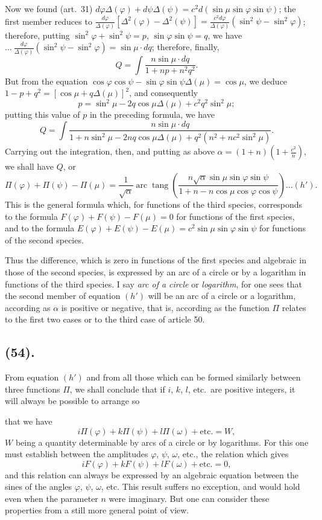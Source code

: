 \documentclass{article}
\begin{document}
Now we found (art.\ 31) $d\varphi\Delta(\varphi)+d\psi\Delta(\psi)=c^{2}d(\sin\mu\sin\varphi\sin\psi)$; the first member reduces to $\frac{d\varphi}{\Delta(\varphi)}[\Delta^{2}(\varphi)-\Delta^{2}(\psi)]=\frac{c^{2}d\varphi}{\Delta(\varphi)}(\sin^{2}\psi-\sin^{2}\varphi)$; therefore, putting $\sin^{2}\varphi+\sin^{2}\psi=p$, $\sin\varphi\sin\psi=q$, we have~$\ldots\ \frac{d\varphi}{\Delta(\varphi)}(\sin^{2}\psi-\sin^{2}\varphi)=\sin\mu\cdot dq$; therefore, finally,
\[ Q=\int\frac{n\sin\mu\cdot dq}{1+np+n^{2}q^{2}}. \]
But from the equation $\cos\varphi\cos\psi-\sin\varphi\sin\psi\Delta(\mu)=\cos\mu$, we deduce $1-p+q^{2}=[\cos\mu+q\Delta(\mu)]^{2}$, and consequently
\[ p=\sin^{2}\mu-2q\cos\mu\Delta(\mu)+c^{2}q^{2}\sin^{2}\mu; \]
putting this value of $p$ in the preceding formula, we have
\[ Q=\int\frac{n\sin\mu\cdot dq}{1+n\sin^{2}\mu-2nq\cos\mu\Delta(\mu)+q^{2}(n^{2}+nc^{2}\sin^{2}\mu)}. \]
Carrying out the integration, then, and putting as above $\alpha=(1+n)\left(1+\frac{c^{2}}{n}\right)$, we shall have $Q$, or
\[ \Pi(\varphi)+\Pi(\psi)-\Pi(\mu)=\frac{1}{\sqrt{\alpha}}\operatorname{arc}\operatorname{tang}\left(\frac{n\sqrt{\alpha}\sin\mu\sin\varphi\sin\psi}{1+n-n\cos\mu\cos\varphi\cos\psi}\right)\ldots(h'). \]
This is the general formula which, for functions of the third species, corresponds to the formula $F(\varphi)+F(\psi)-F(\mu)=0$ for functions of the first species, and to the formula $E(\varphi)+E(\psi)-E(\mu)=c^{2}\sin\mu\sin\varphi\sin\psi$ for functions of the second species.

Thus the difference, which is zero in functions of the first species and algebraic in those of the second species, is expressed by an arc of a circle or by a logarithm in functions of the third species. I say \emph{arc of a circle} or \emph{logarithm}, for one sees that the second member of equation $(h')$ will be an arc of a circle or a logarithm, according as $\alpha$ is positive or negative, that is, according as the function $\Pi$ relates to the first two cases or to the third case of article 50.

\subsection*{(54).}

From equation $(h')$ and from all those which can be formed similarly between three functions $\Pi$, we shall conclude that if $i$, $k$, $l$, etc.\ are positive integers, it will always be possible to arrange so

that we have
\[ i\Pi(\varphi)+k\Pi(\psi)+l\Pi(\omega)+\text{etc.}=W, \]
$W$ being a quantity determinable by arcs of a circle or by logarithms. For this one must establish between the amplitudes $\varphi$, $\psi$, $\omega$, etc., the relation which gives
\[ iF(\varphi)+kF(\psi)+lF(\omega)+\text{etc.}=0, \]
and this relation can always be expressed by an algebraic equation between the sines of the angles $\varphi$, $\psi$, $\omega$, etc. This result suffers no exception, and would hold even when the parameter $n$ were imaginary. But one can consider these properties from a still more general point of view.
\end{document}
